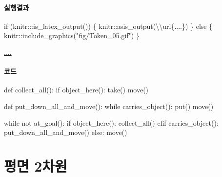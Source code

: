 \documentclass[
  b5paperpaper,
  DIV=11,
  numbers=noendperiod]{scrreprt}
\newenvironment{Shaded}{\begin{snugshade}}{\end{snugshade}}
\newcommand{\ControlFlowTok}[1]{\textcolor[rgb]{0.00,0.23,0.31}{#1}}
\newcommand{\FunctionTok}[1]{\textcolor[rgb]{0.28,0.35,0.67}{#1}}
\newcommand{\KeywordTok}[1]{\textcolor[rgb]{0.00,0.23,0.31}{#1}}
\newcommand{\NormalTok}[1]{\textcolor[rgb]{0.00,0.23,0.31}{#1}}
\newcommand{\SpecialCharTok}[1]{\textcolor[rgb]{0.37,0.37,0.37}{#1}}
\newcommand{\StringTok}[1]{\textcolor[rgb]{0.13,0.47,0.30}{#1}}
\begin{document}
\hypertarget{uxc2e4uxd589uxacb0uxacfc-19}{%
\subsection{실행결과}\label{uxc2e4uxd589uxacb0uxacfc-19}}

\begin{Shaded}
\begin{Highlighting}[]
\ControlFlowTok{if}\NormalTok{ (knitr}\SpecialCharTok{:::}\FunctionTok{is\_latex\_output}\NormalTok{()) \{}
\NormalTok{  knitr}\SpecialCharTok{::}\FunctionTok{asis\_output}\NormalTok{(}\StringTok{\textquotesingle{}}\SpecialCharTok{\textbackslash{}\textbackslash{}}\StringTok{url\{....\}\textquotesingle{}}\NormalTok{)}
\NormalTok{\} }\ControlFlowTok{else}\NormalTok{ \{}
\NormalTok{  knitr}\SpecialCharTok{::}\FunctionTok{include\_graphics}\NormalTok{(}\StringTok{"fig/Token\_05.gif"}\NormalTok{)}
\NormalTok{\}}
\end{Highlighting}
\end{Shaded}

\url{....}

\hypertarget{uxcf54uxb4dc-19}{%
\subsection{코드}\label{uxcf54uxb4dc-19}}

\begin{Shaded}
\begin{Highlighting}[]
\KeywordTok{def}\NormalTok{ collect\_all():}
    \ControlFlowTok{if}\NormalTok{ object\_here():}
\NormalTok{        take()}
\NormalTok{    move()}

\KeywordTok{def}\NormalTok{ put\_down\_all\_and\_move():}
    \ControlFlowTok{while}\NormalTok{ carries\_object():}
\NormalTok{        put()}
\NormalTok{    move()}
    
\ControlFlowTok{while} \KeywordTok{not}\NormalTok{ at\_goal():}
    \ControlFlowTok{if}\NormalTok{ object\_here():}
\NormalTok{        collect\_all()}
    \ControlFlowTok{elif}\NormalTok{ carries\_object():}
\NormalTok{        put\_down\_all\_and\_move()  }
    \ControlFlowTok{else}\NormalTok{:}
\NormalTok{        move()}
\end{Highlighting}
\end{Shaded}

\part{평면 2차원}
\end{document}
